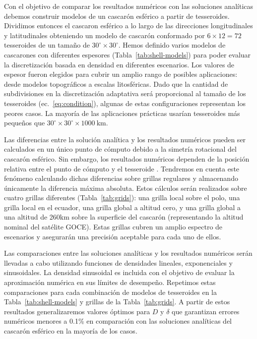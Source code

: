 Con el objetivo de comparar los resultados numéricos con las soluciones
analíticas debemos construir modelos de un cascarón esférico a partir de
tesseroides.
Dividimos entonces el cascaron esférico a lo largo de las direcciones
longitudinales y latitudinales obteniendo un modelo de cascarón conformado por
$6 \times 12 = 72$ tesseroides de un tamaño de $30^\circ \times 30^\circ$.
Hemos definido varios modelos de cascarones con diferentes espesores
(Tabla~\ref{tab:shell-models}) para poder evaluar la discretización basada en
densidad en diferentes escenarios.
Los valores de espesor fueron elegidos para cubrir un amplio rango de
posibles aplicaciones: desde modelos topográficos a escalas litosféricas.
Dado que la cantidad de subdivisiones en la discretización adaptativa será
proporcional al tamaño de los tesseroides (ec.~\ref{eq:condition}),
algunas de estas configuraciones representan los peores casos.
La mayoría de las aplicaciones prácticas usarían tesseroides más pequeños que
$30^\circ \times 30^\circ \times 1000\ \text{km}$.

Las diferencias entre la solución analítica y los resultados numéricos pueden
ser calculados en un único punto de cómputo debido a la simetría rotacional del
cascarón esférico.
Sin embargo, los resultados numéricos dependen de la posición relativa entre el
punto de cómputo y el tesseroide \citep{ku1977, asgharzadeh2007, uieda2016}.
Tendremos en cuenta este fenómeno calculando dichas diferencias sobre grillas
regulares y almacenando únicamente la diferencia máxima absoluta.
Estos cálculos serán realizados sobre cuatro grillas diferentes
(Tabla~\ref{tab:grids}):
una grilla local sobre el polo, una grilla local en el ecuador, una grilla
global a altitud cero, y una grilla global a una altitud de 260km sobre la
superficie del cascarón (representando la altitud nominal del satélite GOCE).
Estas grillas cubren un amplio espectro de escenarios y asegurarán una
precisión aceptable para cada uno de ellos.

Las comparaciones entre las soluciones analíticas y los resultados numéricos
serán llevadas a cabo utilizando funciones de densidades lineales,
exponenciales y sinusoidales.
La densidad sinusoidal es incluida con el objetivo de evaluar la aproximación
numérica en sus límites de desempeño.
Repetimos estas comparaciones para cada combinación de modelos de tesseroides
en la Tabla~\ref{tab:shell-models} y grillas de la Tabla~\ref{tab:grids}.
A partir de estos resultados generalizaremos valores óptimos para $D$
y $\delta$ que garantizan errores numéricos menores a 0.1\% en comparación con
las soluciones analíticas del cascarón esférico en la mayoría de los casos.

